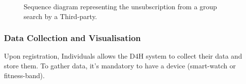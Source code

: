             \begin{figure}[H]
                \centering
                \caption{Sequence diagram representing the unsubscription from a group search by a Third-party.}
                \label{fig:Group-request-unsubscription-process-sequence-diagram}
            \end{figure}
        
        \subsubsection{Data Collection and Visualisation}
            
            Upon registration, Individuals allows the D4H system to collect their data and store them. To gather data, it's mandatory to have a device (smart-watch or fitness-band).
            
